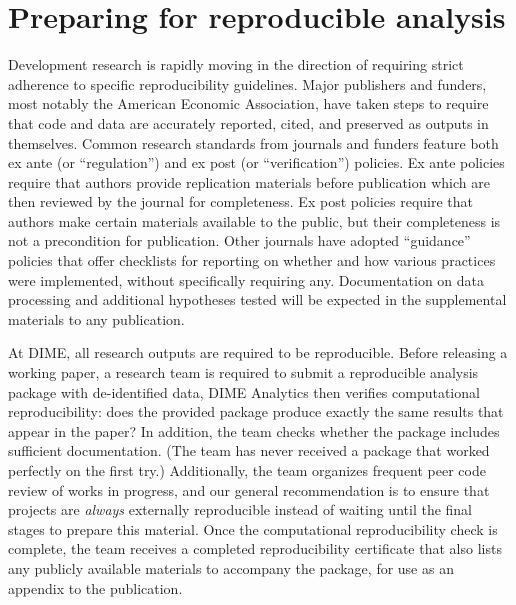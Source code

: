 \section{Preparing for reproducible analysis}


Development research is rapidly moving in the direction of requiring strict adherence
to specific reproducibility guidelines.\cite{christensen2018transparency}
Major publishers and funders, most notably the American Economic Association,
have taken steps to require that code and data
are accurately reported, cited, and preserved as outputs in themselves.
Common research standards from journals and funders feature both ex ante
(or ``regulation'') and ex post (or ``verification'') policies.\cite{stodden2013toward}
Ex ante policies require that authors
provide replication materials before publication
which are then reviewed by the journal for completeness.
Ex post policies require that authors make certain materials available to the public,
but their completeness is not a precondition for publication.
Other journals have adopted ``guidance'' policies that offer checklists
for reporting on whether and how various practices were implemented,
without specifically requiring any.\cite{nosek2015promoting}
Documentation on data processing and additional hypotheses tested
will be expected in the supplemental materials to any publication.

At DIME, all research outputs are required to be reproducible.
Before releasing a working paper,
a research team is required to submit
a reproducible analysis package with de-identified data,
DIME Analytics then verifies computational reproducibility:
does the provided package produce exactly the same results that appear in the paper?
In addition, the team checks whether the package includes sufficient documentation.
(The team has never received a package that worked perfectly on the first try.)
Additionally, the team organizes frequent peer code review of works in progress,
and our general recommendation is to ensure that projects
are \textit{always} externally reproducible
instead of waiting until the final stages to prepare this material.
Once the computational reproducibility check is complete, 
the team receives a completed reproducibility certificate
that also lists any publicly available materials to accompany the package,
for use as an appendix to the publication.


